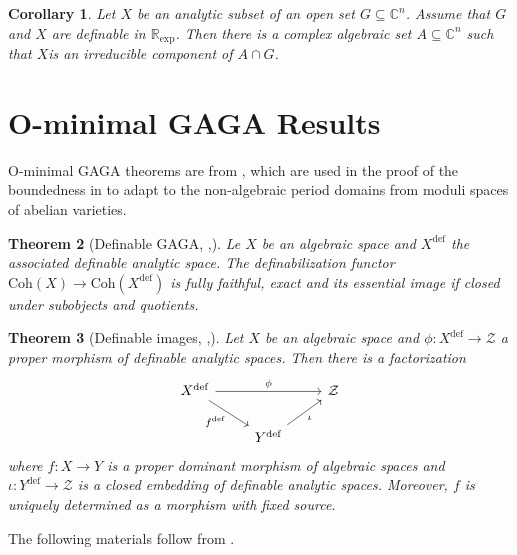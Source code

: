 \documentclass{amsart}
\newtheorem{theorem}{Theorem}[subsection]
\newtheorem{corollary}[theorem]{Corollary}
\theoremstyle{definition}
\numberwithin{equation}{section}
\newcommand{\definable}{\mathrm{def}}
\begin{document}
\begin{corollary}
  Let $X$ be an analytic subset of an open set $G\subseteq \mathbb{C}^n$.
  Assume that $G$ and $X$ are definable in $\mathbb{R}_{\exp}$.
  Then there is a complex algebraic set $A\subseteq \mathbb{C}^n$ such that $X $is an irreducible component of $A\cap G$.
\end{corollary}

\section{O-minimal GAGA Results}
O-minimal GAGA theorems are from \cite{zbMATH07662555},
which are used in the proof of the boundedness in \cite{arXiv:2507.00973,arXiv:2508.19215}
to adapt to the non-algebraic period domains from moduli spaces of abelian varieties.

\begin{tcolorbox}[title = {\bfseries\Large Main results}]
  \begin{theorem}[{Definable GAGA, \cite[Theorem 2.1]{arXiv:2508.19215},\cite[Theorem 1.4]{zbMATH07662555}}]
    Le $X$ be an algebraic space and $X^{\definable}$ the associated definable analytic space.
    The definabilization functor $\mathrm{Coh}(X) \to \mathrm{Coh}(X^{\definable})$ is fully faithful, exact and
    its essential image if closed under subobjects and quotients.
  \end{theorem}

  \begin{theorem}[{Definable images, \cite[Theorem 2.2]{arXiv:2508.19215},\cite[Theorem 1.3]{zbMATH07662555}}]
    \label{def image}
    Let $X$ be an algebraic space and
    $\phi: X^{\definable} \to \mathcal{Z}$ a proper morphism of definable analytic spaces.
    Then there is a factorization
    \[\begin{tikzcd}
      X^{\definable}\ar[rr,"\phi"]\ar[dr,"f^{\definable}"'] & & \mathcal{Z} \\
                                                            & Y^{\definable}\ar[ur,"\iota"'] &
    \end{tikzcd}\]
    where $f: X\to Y$ is a proper dominant morphism of algebraic spaces and
    $\iota: Y^{\definable} \to \mathcal{Z}$ is a closed embedding of definable analytic spaces.
    Moreover, $f$ is uniquely determined as a morphism with fixed source.
  \end{theorem}
\end{tcolorbox}

The following materials follow from \cite{zbMATH07662555}.
\end{document}
